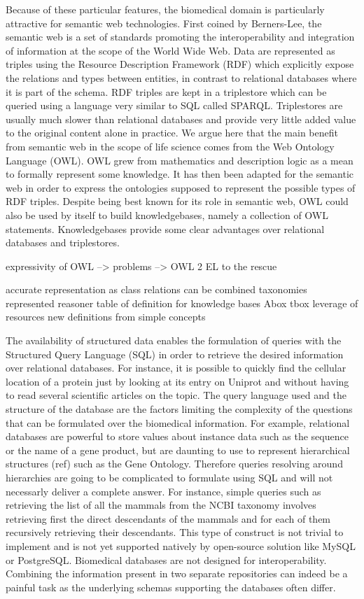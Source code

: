 \documentclass{bioinfo}
\begin{document}
Because of these particular features, the biomedical domain is particularly attractive for semantic web technologies. First coined by 
Berners-Lee, the semantic web is a set of standards promoting the interoperability and integration of information at the scope of the World Wide
Web. Data are represented as triples using the Resource Description Framework (RDF) which explicitly expose the relations and types between
entities, in contrast to relational databases where it is part of the schema. RDF triples are kept in a triplestore
which can be queried using a language very similar to SQL called SPARQL. Triplestores are usually much slower than relational databases and
provide very little added value to the original content alone in practice. We argue here that the main benefit from semantic web in the scope 
of life science comes from the Web Ontology Language (OWL). OWL grew from mathematics and description logic as a mean to formally represent some 
knowledge. It has then been adapted for the semantic web in order to express the ontologies supposed to represent the possible types of RDF 
triples. Despite being best known for its role in semantic web, OWL could also be used by itself to build knowledgebases, namely a collection 
of OWL statements. Knowledgebases provide some clear advantages over relational databases and triplestores.

expressivity of OWL --> problems --> OWL 2 EL to the rescue

accurate representation as class
relations can be combined
taxonomies represented
reasoner
table of definition for knowledge bases
Abox tbox
leverage of resources
new definitions from simple concepts



The availability of structured data enables the formulation of queries with the Structured Query Language (SQL) in order to retrieve the desired 
information over relational databases. For instance, it is possible to
quickly find the cellular location of a protein just by looking at its entry on Uniprot and without having to read several scientific articles
on the topic. The query language used and the structure of the database are the factors limiting the complexity of the questions that can be 
formulated over the biomedical information. For example, relational databases are powerful to store values about instance data such as the
sequence or the name of a gene product, but are daunting to use to represent hierarchical structures (ref) such as the Gene Ontology. Therefore
queries resolving around hierarchies are going to be complicated to formulate using SQL and will not necessarly deliver a complete answer. For
instance, simple queries such as retrieving the list of all the mammals from the NCBI taxonomy involves retrieving first the direct descendants
of the mammals and for each of them recursively retrieving their descendants. This type of construct is not trivial to implement
and is not yet supported natively by open-source solution like MySQL or PostgreSQL.
Biomedical databases are not designed for interoperability. Combining the information present in
two separate repositories can indeed be a painful task as the underlying schemas supporting the databases often differ.
\end{document}

